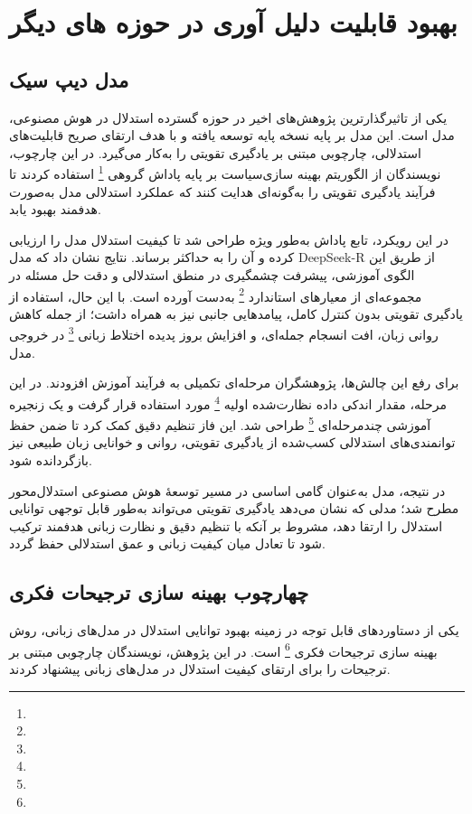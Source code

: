 \section{بهبود قابلیت دلیل آوری در حوزه های دیگر}

\subsection{
مدل دیپ سیک
}
یکی از تاثیرگذارترین پژوهش‌های اخیر در حوزه گسترده استدلال در هوش مصنوعی، مدل
است.
\cite{b36}
این مدل بر پایه نسخه پایه
توسعه یافته و با هدف ارتقای صریح قابلیت‌های استدلالی، چارچوبی مبتنی بر یادگیری تقویتی را به‌کار می‌گیرد. در این چارچوب، نویسندگان از الگوریتم ‫ﺑﻬﯿﻨﻪ‬ ‫ﺳﺎزی‬‫ﺳﯿﺎﺳﺖ‬ ‫ﺑﺮ‬ ‫ﭘﺎﯾﻪ‬ ‫ﭘﺎداش‬ ‫ﮔﺮوﻫﯽ‬
\footnote{}
استفاده کردند تا فرآیند یادگیری تقویتی را به‌گونه‌ای هدایت کنند که عملکرد استدلالی مدل به‌صورت هدفمند بهبود یابد.

در این رویکرد، تابع پاداش به‌طور ویژه طراحی شد تا کیفیت استدلال مدل را ارزیابی کرده و آن را به حداکثر برساند. نتایج نشان داد که مدل DeepSeek-R از طریق این الگوی آموزشی، پیشرفت چشمگیری در منطق استدلالی و دقت حل مسئله در مجموعه‌ای از معیارهای استاندارد 
\footnote{}
به‌دست آورده است. با این حال، استفاده از یادگیری تقویتی بدون کنترل کامل، پیامدهایی جانبی نیز به همراه داشت؛ از جمله کاهش روانی زبان، افت انسجام جمله‌ای، و افزایش بروز پدیده اختلاط زبانی
\footnote{}
در خروجی مدل.

برای رفع این چالش‌ها، پژوهشگران مرحله‌ای تکمیلی به فرآیند آموزش افزودند. در این مرحله، مقدار اندکی داده نظارت‌شده اولیه
\footnote{}
مورد استفاده قرار گرفت و یک زنجیره آموزشی چندمرحله‌ای
\footnote{}
طراحی شد. این فاز تنظیم دقیق کمک کرد تا ضمن حفظ توانمندی‌های استدلالی کسب‌شده از یادگیری تقویتی، روانی و خوانایی زبان طبیعی نیز بازگردانده شود.

در نتیجه، مدل
به‌عنوان گامی اساسی در مسیر توسعهٔ هوش مصنوعی استدلال‌محور مطرح شد؛ مدلی که نشان می‌دهد یادگیری تقویتی می‌تواند به‌طور قابل توجهی توانایی استدلال را ارتقا دهد، مشروط بر آنکه با تنظیم دقیق و نظارت زبانی هدفمند ترکیب شود تا تعادل میان کیفیت زبانی و عمق استدلالی حفظ گردد.

\subsection{
چهارچوب بهینه سازی ترجیحات فکری
}


یکی از دستاوردهای قابل توجه در زمینه بهبود توانایی استدلال در مدل‌های زبانی، روش بهینه سازی ترجیحات فکری
\footnote{}
است.
\cite{b53}
در این پژوهش، نویسندگان چارچوبی مبتنی بر ترجیحات را برای ارتقای کیفیت استدلال در مدل‌های زبانی پیشنهاد کردند. 

